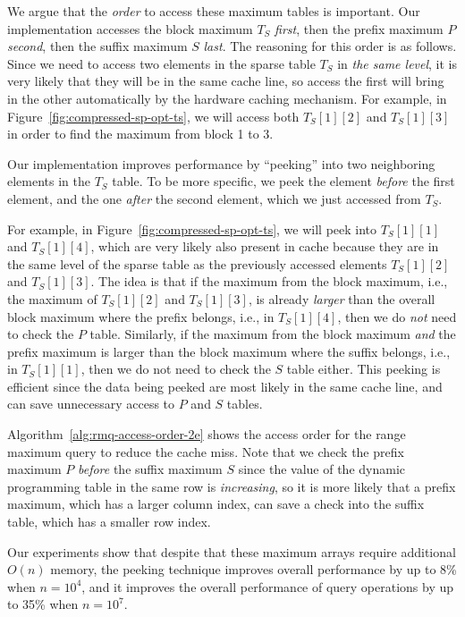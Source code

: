 We argue that the {\em order} to access these maximum tables is
important.  Our implementation accesses the block maximum $T_S$ {\em
first}, then the prefix maximum $P$ {\em second}, then the suffix
maximum $S$ {\em last}.  The reasoning for this order is as follows.
Since we need to access two elements in the sparse table $T_S$ in {\em
the same level}, it is very likely that they will be in the same cache
line, so access the first will bring in the other automatically by the
hardware caching mechanism.  For example, in
Figure~\ref{fig:compressed-sp-opt-ts}, we will access both $T_{S}[1][2]$
and $T_{S}[1][3]$ in order to find the maximum from block 1 to 3.

Our implementation improves performance by ``peeking'' into two
neighboring elements in the $T_{S}$ table.  To be more specific, we
peek the element {\em before} the first element, and the one {\em
  after} the second element, which we just accessed from $T_S$.

For example, in Figure~\ref{fig:compressed-sp-opt-ts}, we will peek into
$T_{S}[1][1]$ and $T_{S}[1][4]$, which are very likely also present in
cache because they are in the same level of the sparse table as the
previously accessed elements $T_{S}[1][2]$ and $T_{S}[1][3]$.  The idea
is that if the maximum from the block maximum, i.e., the maximum of
$T_{S}[1][2]$ and $T_{S}[1][3]$, is already {\em larger} than the
overall block maximum where the prefix belongs, i.e., in
$T_{S}[1][4]$, then we do {\em not} need to check the $P$ table.
Similarly, if the maximum from the block maximum {\em and} the prefix
maximum is larger than the block maximum where the suffix belongs,
i.e., in $T_{S}[1][1]$, then we do not need to check the $S$ table
either.  This peeking is efficient since the data being peeked are
most likely in the same cache line, and can save unnecessary access to
$P$ and $S$ tables.

Algorithm~\ref{alg:rmq-access-order-2e} shows the access order for the
range maximum query to reduce the cache miss.  Note that we check the
prefix maximum $P$ {\em before} the suffix maximum $S$ since the value
of the dynamic programming table in the same row is {\em increasing},
so it is more likely that a prefix maximum, which has a larger column
index, can save a check into the suffix table, which has a smaller row
index.

Our experiments show that despite that these maximum arrays require
additional $O(n)$ memory, the peeking technique improves overall
performance by up to 8\% when $n = 10^4$, and it improves the overall
performance of query operations by up to 35\% when $n = 10^7$.




